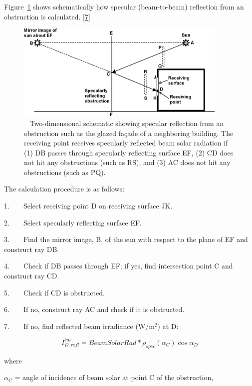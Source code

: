 Figure~\ref{fig:two-dimensional-schematic-showing-specular} shows schematically how specular (beam-to-beam) reflection from an obstruction is calculated. \protect\hyperlink{ux5fftn7}{{[}7{]}}

\begin{figure}[hbtp] %
\centering
\includegraphics[width=0.9\textwidth, height=0.9\textheight, keepaspectratio=true]{media/image703.png}
\caption{  Two-dimensional schematic showing specular reflection from an obstruction such as the glazed façade of a neighboring building. The receiving point receives specularly reflected beam solar radiation if (1) DB passes through specularly reflecting surface EF, (2) CD does not hit any obstructions (such as RS), and (3) AC does not hit any obstructions (such as PQ). \protect \label{fig:two-dimensional-schematic-showing-specular}}
\end{figure}

The calculation procedure is as follows:

1.~~~~Select receiving point D on receiving surface JK.

2.~~~~Select specularly reflecting surface EF.

3.~~~~Find the mirror image, B, of the sun with respect to the plane of EF and construct ray DB.

4.~~~~Check if DB passes through EF; if yes, find intersection point C and construct ray CD.

5.~~~~Check if CD is obstructed.

6.~~~~If no, construct ray AC and check if it is obstructed.

7.~~~~If no, find reflected beam irradiance (W/m\(^{2}\)) at D:

\begin{equation}
I_{D,refl}^{bm} = BeamSolarRad*{\rho_{spec}}({\alpha_C})\cos {\alpha_D}
\end{equation}

where

\({\alpha_C}\) = angle of incidence of beam solar at point C of the obstruction,

